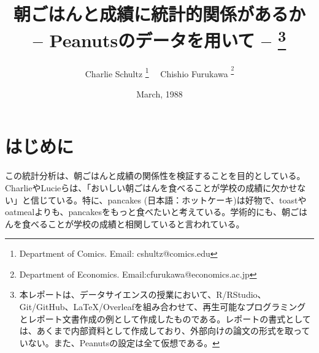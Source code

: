 \documentclass[xelatex,ja=standard]{bxjsarticle}
\title{朝ごはんと成績に統計的関係があるか \\ -- Peanutsのデータを用いて -- \thanks{本レポートは、データサイエンスの授業において、R/RStudio、Git/GitHub、LaTeX/Overleafを組み合わせて、再生可能なプログラミングとレポート文書作成の例として作成したものである。レポートの書式としては、あくまで内部資料として作成しており、外部向けの論文の形式を取っていない。また、Peanutsの設定は全て仮想である。}}
\author{Charlie Schultz
\thanks{Department of Comics. Email: cshultz@comics.edu}  \ \  Chishio Furukawa
\textsuperscript\thanks{Department of Economics. Email:cfurukawa@economics.ac.jp}}
\date{March, 1988}
\begin{document}
\renewcommand\footnotelayout{\small}
\sffamily\mdseries



\section{はじめに}


この統計分析は、朝ごはんと成績の関係性を検証することを目的としている。CharlieやLucieらは、「おいしい朝ごはんを食べることが学校の成績に欠かせない」と信じている。特に、pancakes (日本語：ホットケーキ)は好物で\citep{peanutsbook}、toastやoatmealよりも、pancakesをもっと食べたいと考えている。学術的にも、朝ごはんを食べることが学校の成績と相関していると言われている\citep{Chandler1995}。

% 
 
% 

%

%
%
\end{document}
